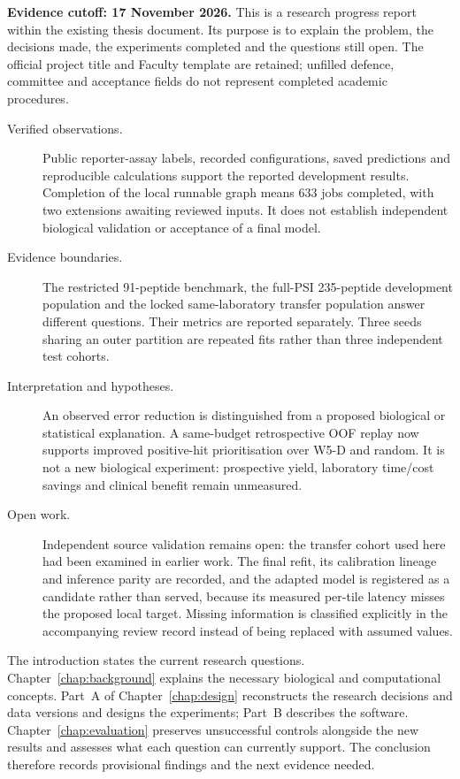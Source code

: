 \noindent\textbf{Evidence cutoff: 17 November 2026.} This is a research progress report within the
existing thesis document. Its purpose is to explain the problem, the decisions made, the experiments
completed and the questions still open. The official project title and Faculty template are retained;
unfilled defence, committee and acceptance fields do not represent completed academic procedures.

\begin{description}
  \item[Verified observations.] Public reporter-assay labels, recorded configurations, saved
  predictions and reproducible calculations support the reported development results. Completion
  of the local runnable graph means 633 jobs completed, with two extensions awaiting reviewed inputs.
  It does not establish independent biological validation or acceptance of a final model.
  \item[Evidence boundaries.] The restricted 91-peptide benchmark, the full-PSI 235-peptide development
  population and the locked same-laboratory transfer population answer different questions. Their
  metrics are reported separately. Three seeds sharing an outer partition are repeated fits rather
  than three independent test cohorts.
  \item[Interpretation and hypotheses.] An observed error reduction is distinguished from a proposed
  biological or statistical explanation. A same-budget retrospective OOF replay now supports
  improved positive-hit prioritisation over W5-D and random. It is not a new biological experiment:
  prospective yield, laboratory time/cost savings and clinical benefit remain unmeasured.
  \item[Open work.] Independent source validation remains open: the transfer cohort used here had
  been examined in earlier work. The final refit, its calibration lineage and inference parity are
  recorded, and the adapted model is registered as a candidate rather than served, because its
  measured per-tile latency misses the proposed local target. Missing information is classified
  explicitly in the accompanying review record instead of being replaced with assumed values.
\end{description}

The introduction states the current research questions. Chapter~\ref{chap:background} explains the
necessary biological and computational concepts. Part~A of Chapter~\ref{chap:design} reconstructs
the research decisions and data versions and designs the experiments; Part~B describes the software. Chapter~\ref{chap:evaluation} preserves unsuccessful
controls alongside the new results and assesses what each question can currently support.
The conclusion therefore records provisional findings and the next evidence needed.
